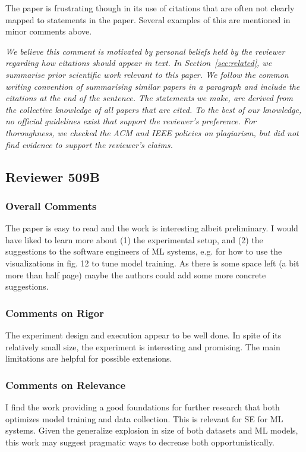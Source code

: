 \documentclass[conference,review,anonymous]{IEEEtran}
\newcommand{\highlight}[1]{\begin{framed}%
  \noindent\emph{#1}
\end{framed}}
\begin{document}
The paper is frustrating though in its use of citations that are often
not clearly mapped to statements in the paper. Several examples of
this are mentioned in minor comments above.

\highlight{We believe this comment is motivated by personal beliefs
held by the reviewer regarding how citations should appear in text. In
Section~\ref{sec:related}, we summarise prior scientific work relevant
to this paper. We follow the common writing convention of summarising
similar papers in a paragraph and include the citations at the end of
the sentence. The statements we make, are derived from the collective
knowledge of all papers that are cited. To the best of our knowledge,
no official guidelines exist that support the reviewer's
preference. For thoroughness, we checked the ACM and IEEE policies on
plagiarism, but did not find evidence to support the reviewer's
claims.}

\subsection{Reviewer 509B}

\subsubsection{Overall Comments}
The paper is easy to read and the work is interesting albeit
preliminary. I would have liked to learn more about (1) the
experimental setup, and (2) the suggestions to the software engineers
of ML systems, e.g. for how to use the visualizations in fig. 12 to
tune model training. As there is some space left (a bit more than half
page) maybe the authors could add some more concrete suggestions.

\subsubsection{Comments on Rigor}
The experiment design and execution appear to be well done. In spite
of its relatively small size, the experiment is interesting and
promising. The main limitations are helpful for possible extensions.

\subsubsection{Comments on Relevance}
I find the work providing a good foundations for further research that
both optimizes model training and data collection. This is relevant
for SE for ML systems. Given the generalize explosion in size of both
datasets and ML models, this work may suggest pragmatic ways to
decrease both opportunistically.
\end{document}
